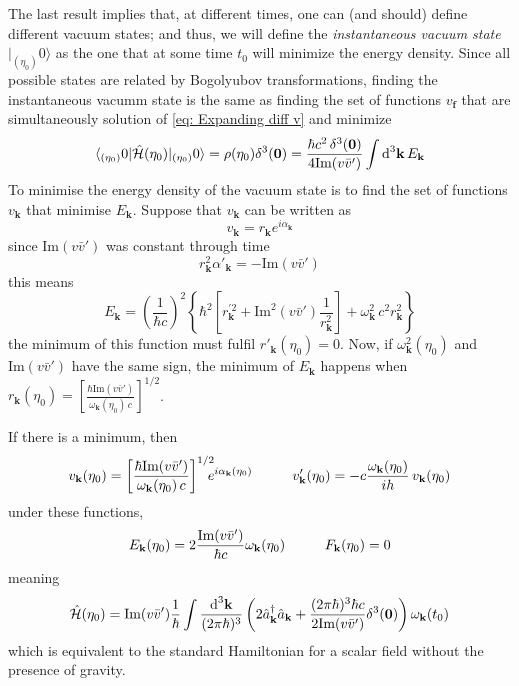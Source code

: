 The last result implies that, at different times, one can (and should) define different vacuum states; and thus, we will define the \textit{instantaneous vacuum state} $|_{(\eta_0)}0\rangle$ as the one that at some time $t_0$ will minimize the energy density. Since all possible states are related by Bogolyubov transformations, finding the instantaneous vacumm state is the same as finding the set of functions $v_\mathbf{f}$ that are simultaneously solution of \ref{eq: Expanding diff v} and minimize
\begin{equation}
	\langle_{(\eta_0)}0|\hat{\mathcal{H}}(\eta_0)|_{(\eta_0)}0\rangle=\rho(\eta_0)\delta^3(\mathbf{0})=\frac{\hbar c^2 \,\delta^3(\mathbf{0})}{4\text{Im}(v\bar v')}\int\text{d}^3\mathbf{k}\,E_\mathbf{k}
\end{equation}
To minimise the energy density of the vacuum state is to find the set of functions $v_\mathbf{k}$ that minimise $E_\mathbf{k}$. Suppose that $v_\mathbf{k}$ can be written as
\begin{equation}
	v_\mathbf{k}=r_\mathbf{k}e^{i\alpha_\mathbf{k}}
\end{equation}
since Im$(v\bar v')$ was constant through time
\begin{equation}
	r_\mathbf{k}^2\alpha'_\mathbf{k}=-\text{Im}(v\bar v')
\end{equation}
this means
\begin{equation}
	E_\mathbf{k}=\left(\frac{1}{\hbar c}\right)^2\left\{\hbar^2\left[r^{'2}_\mathbf{k}+\text{Im}^2\left(v\bar v'\right)\frac{1}{r_\mathbf{k}^2}\right]+\omega^2_\mathbf{k}\,c^2r_\mathbf{k}^2\right\}
\end{equation}
the minimum of this function must fulfil $r'_\mathbf{k}(\eta_0)=0$. Now, if $\omega_\mathbf{k}^2(\eta_0)$ and $\text{Im}(v\bar v')$ have the same sign, the minimum of $E_\mathbf{k}$ happens when $r_\mathbf{k}(\eta_0)=\left[\frac{\hbar\text{Im}(v\bar v')}{\omega_\mathbf{k}(\eta_0)\,c}\right]^{1/2}$.

If there is a minimum, then
\begin{equation}
	v_\mathbf{k}(\eta_0)=\left[\frac{\hbar\text{Im}(v\bar v')}{\omega_\mathbf{k}(\eta_0)\,c}\right]^{1/2}\!\!\!\!e^{i\alpha_\mathbf{k}(\eta_0)}\hspace{1.0cm}v'_\mathbf{k}(\eta_0)=-c\frac{\omega_\mathbf{k}(\eta_0)}{ih}\,v_\mathbf{k}(\eta_0)
\end{equation}
under these functions,
\begin{equation}
	E_\mathbf{k}(\eta_0)=2\frac{\text{Im}(v\bar v')}{\hbar c}\omega_\mathbf{k}(\eta_0)\hspace{1.0cm}F_\mathbf{k}(\eta_0)=0
\end{equation}
meaning
\begin{equation}
	\hat{\mathcal{H}}(\eta_0)=\text{Im}(v\bar v')\frac{1}{\hbar}\int\frac{\text{d}^3\mathbf{k}}{(2\pi\hbar)^3}\left(2\hat{a}_\mathbf{k}^\dagger\hat{a}_\mathbf{k}+\frac{(2\pi\hbar)^3\hbar c}{2\text{Im}(v\bar v')}\delta^3(\mathbf{0})\right)\omega_\mathbf{k}(t_0)
\end{equation}
which is equivalent to the standard Hamiltonian for a scalar field without the presence of gravity.

